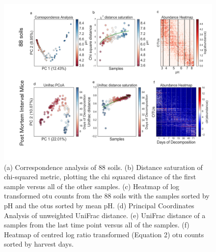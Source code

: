 \begin{figure}[H]
        \centering
        \includegraphics[width=1\textwidth]{ch2/Figure2.pdf}
        \caption[Two case studies show casing how horseshoes can appear in the context of
          soil microbial communities and post-mortem microbial communities.]
        {(a) Correspondence analysis of 88 soils.  (b) Distance saturation of chi-squared metric, plotting the chi squared distance of the first sample versus all of the other samples. (c) Heatmap of log transformed \gls{otu} counts from the 88 soils with the samples sorted by pH and the \gls{otu}s sorted by mean pH.  (d) Principal Coordinates Analysis of unweighted UniFrac distance.  (e) UniFrac distance of a samples from the last time point versus all of the samples. (f) Heatmap of centred log ratio transformed (Equation 2) \gls{otu} counts sorted by harvest days.}
        \label{figb2}
\end{figure}
